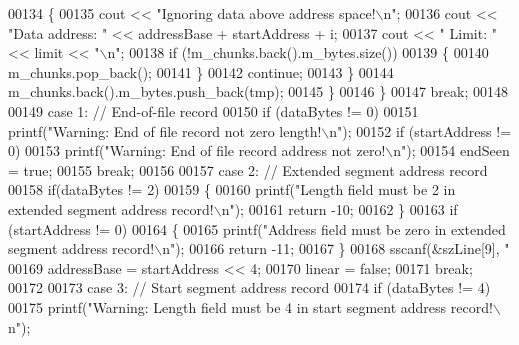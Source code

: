 \begin{DoxyCode}
{{{{00134                     \{
00135                         cout << \textcolor{stringliteral}{"Ignoring data above address space!\(\backslash\)n"};
00136                         cout << \textcolor{stringliteral}{"Data address: "} << addressBase + startAddress + 
      i;
00137                         cout << \textcolor{stringliteral}{" Limit: "} << limit << \textcolor{stringliteral}{"\(\backslash\)n"};
00138                         \textcolor{keywordflow}{if} (!m\_chunks.back().m\_bytes.size())
00139                         \{
00140                             m\_chunks.pop\_back();
00141                         \}
00142                         \textcolor{keywordflow}{continue};
00143                     \}
00144                     m\_chunks.back().m\_bytes.push\_back(tmp);
00145                 \}
00146             \}
00147             \textcolor{keywordflow}{break};
00148 
00149         \textcolor{keywordflow}{case} 1: \textcolor{comment}{// End-of-file record}
00150             \textcolor{keywordflow}{if} (dataBytes != 0)
00151                 printf(\textcolor{stringliteral}{"Warning: End of file record not zero length!\(\backslash\)n"});
00152             \textcolor{keywordflow}{if} (startAddress != 0)
00153                 printf(\textcolor{stringliteral}{"Warning: End of file record address not zero!\(\backslash\)n"});
00154             endSeen = \textcolor{keyword}{true};
00155             \textcolor{keywordflow}{break};
00156 
00157         \textcolor{keywordflow}{case} 2: \textcolor{comment}{// Extended segment address record}
00158             \textcolor{keywordflow}{if}(dataBytes != 2)
00159             \{
00160                 printf(\textcolor{stringliteral}{"Length field must be 2 in extended segment address record!\(\backslash\)n"});
00161                 \textcolor{keywordflow}{return} -10;
00162             \}
00163             \textcolor{keywordflow}{if} (startAddress != 0)
00164             \{
00165                 printf(\textcolor{stringliteral}{"Address field must be zero in extended segment address record!\(\backslash\)n"});
00166                 \textcolor{keywordflow}{return} -11;
00167             \}
00168             sscanf(&szLine[9], \textcolor{stringliteral}{"%
00169             addressBase = startAddress << 4;
00170             linear = \textcolor{keyword}{false};
00171             \textcolor{keywordflow}{break};
00172 
00173         \textcolor{keywordflow}{case} 3: \textcolor{comment}{// Start segment address record}
00174             \textcolor{keywordflow}{if} (dataBytes != 4)
00175                 printf(\textcolor{stringliteral}{"Warning: Length field must be 4 in start segment address record!\(\backslash\)n"});
}}}}}
\end{DoxyCode}
